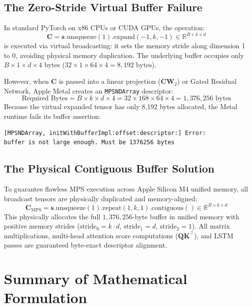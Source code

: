 \documentclass[11pt,a4paper]{article}
\begin{document}
\subsection{The Zero-Stride Virtual Buffer Failure}
In standard PyTorch on x86 CPUs or CUDA GPUs, the operation:
\begin{equation}
    \mathbf{C} = \mathbf{s}.\mathrm{unsqueeze}(1).\mathrm{expand}(-1, k, -1) \in \mathbb{R}^{B \times k \times d}
\end{equation}
is executed via virtual broadcasting: it sets the memory stride along dimension 1 to $0$, avoiding physical memory duplication. The underlying buffer occupies only $B \times 1 \times d \times 4$ bytes ($32 \times 1 \times 64 \times 4 = 8,192\text{ bytes}$).

However, when $\mathbf{C}$ is passed into a linear projection ($\mathbf{C} \mathbf{W}_2$) or Gated Residual Network, Apple Metal creates an \texttt{MPSNDArray} descriptor:
\begin{equation}
    \text{Required Bytes} = B \times k \times d \times 4 = 32 \times 168 \times 64 \times 4 = 1,376,256\text{ bytes}
\end{equation}
Because the virtual expanded tensor has only 8,192 bytes allocated, the Metal runtime fails its buffer assertion:
\begin{verbatim}
[MPSNDArray, initWithBufferImpl:offset:descriptor:] Error: 
buffer is not large enough. Must be 1376256 bytes
\end{verbatim}

\subsection{The Physical Contiguous Buffer Solution}
To guarantee flawless MPS execution across Apple Silicon M4 unified memory, all broadcast tensors are physically duplicated and memory-aligned:
\begin{equation}
    \mathbf{C}_{\text{MPS}} = \mathbf{s}.\mathrm{unsqueeze}(1).\mathrm{repeat}(1, k, 1).\mathrm{contiguous}() \in \mathbb{R}^{B \times k \times d}
\end{equation}
This physically allocates the full $1,376,256$-byte buffer in unified memory with positive memory strides ($\text{stride}_0 = k \cdot d$, $\text{stride}_1 = d$, $\text{stride}_2 = 1$). All matrix multiplications, multi-head attention score computations ($\mathbf{Q} \mathbf{K}^\top$), and LSTM passes are guaranteed byte-exact descriptor alignment.

\section{Summary of Mathematical Formulation}
\end{document}
